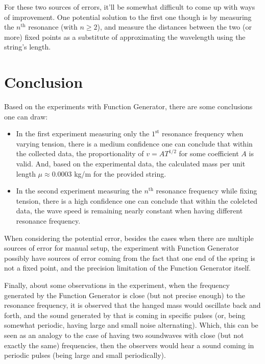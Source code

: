 \documentclass{article}
\begin{document}
For these two sources of errors, it'll be somewhat difficult to come up with ways of improvement. One potential solution to the first one though is by measuring the $n^\text{th}$ resonance (with $n\geq 2$), and measure the distances between the two (or more) fixed points as a substitute of approximating the wavelength using the string's length.

\newpage

\section{Conclusion}
Based on the experiments with Function Generator, there are some conclusions one can draw:
\begin{itemize}
    \item[1.] In the first experiment measuring only the $1^\text{st}$ resonance frequency when varying tension, there is a medium confidence one can conclude that within the collected data, the proportionality of $v = A T^{1/2}$ for some coefficient $A$ is valid. And, based on the experimental data, the calculated mass per unit length $\mu \approx 0.0003$ kg/m for the provided string.
    \item[2.] In the second experiment measuring the $n^\text{th}$ resonance  frequency while fixing tension, there is a high confidence one can conclude that within the colelcted data, the wave speed is remaining nearly constant when having different resonance frequency. 
\end{itemize}
When considering the potential error, besides the cases when there are multiple sources of error for manual setup, the experiment with Function Generator possibly have sources of error coming from the fact that one end of the spring is not a fixed point, and the precision limitation of the Function Generator itself.

\hfil

Finally, about some observations in the experiment, when the frequency generated by the Function Generator is close (but not precise enough) to the resonance frequency, it is observed that the hanged mass would oscillate back and forth, and the sound generated by that is coming in specific pulses (or, being somewhat periodic, having large and small noise alternating). Which, this can be seen as an analogy to the case of having two soundwaves with close (but not exactly the same) frequencies, then the observers would hear a sound coming in periodic pulses (being large and small periodically).
\end{document}
